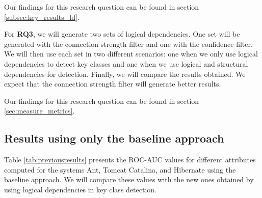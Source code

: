 \medskip

\noindent{}

\medskip

Our findings for this research question can be found in section \ref{subsec:key_results_ld}.

For \textbf {RQ3}, we will generate two sets of logical dependencies. One set will be generated with the connection strength filter and one with the confidence filter. We will then use each set in two different scenarios: one when we only use logical dependencies to detect key classes and one when we use logical and structural dependencies for detection. Finally, we will compare the results obtained. We expect that the connection strength filter will generate better results. 

\medskip

\noindent{}

\medskip
Our findings for this research question can be found in section \ref{sec:measure_metrics}.


\subsection{Results using only the baseline approach}
\label{subsec:key_results_baseline}

\hspace{4em}Table \ref{tab:previousresults} presents the ROC-AUC values for different attributes computed for the systems Ant, Tomcat Catalina, and Hibernate using the baseline approach. We will compare these values with the new ones obtained by using logical dependencies in key class detection.

\begin{table}
\renewcommand{\arraystretch}{1}
\caption{ROC-AUC metric values extracted. }
\label{tab:previousresults}
\centering
{}
\end{table}

